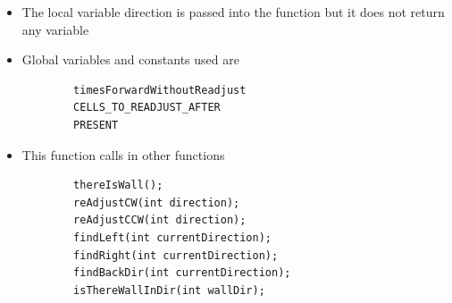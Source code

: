 \documentclass[11pt]{article}
\begin{document}
\begin{itemize}
\begin{figure}[htp]
\label{}
\end{figure}
	\begin{itemize}
	\item The local variable direction is passed into the function but it does not return any variable
	\item Global variables and constants used are
	\begin{verbatim}
		timesForwardWithoutReadjust
		CELLS_TO_READJUST_AFTER
		PRESENT
	\end{verbatim}
	\item This function calls in other functions
	\begin{verbatim}
		thereIsWall();
		reAdjustCW(int direction);
		reAdjustCCW(int direction);
		findLeft(int currentDirection);
		findRight(int currentDirection);
		findBackDir(int currentDirection);
		isThereWallInDir(int wallDir);
	\end{verbatim}
	\end{itemize}
\end{itemize}
\newpage

\end{document}
